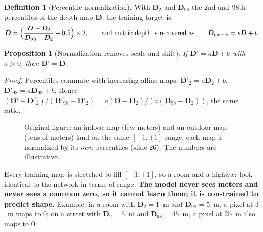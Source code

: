 \documentclass[11pt,a4paper]{article}
\theoremstyle{plain}
\newtheorem{proposition}[theorem]{Proposition}
\theoremstyle{definition}
\newtheorem{definition}[theorem]{Definition}
\numberwithin{equation}{section}
\begin{document}
\begin{definition}[Percentile normalization]
With $\bm D_2$ and $\bm D_{98}$ the 2nd and 98th percentiles of the depth map $\bm D$, the training target is
\begin{equation}
\tilde{\bm D}=\Bigl(\frac{\bm D-\bm D_2}{\bm D_{98}-\bm D_2}-0.5\Bigr)\times2,\qquad\text{and metric depth is recovered as}\qquad \tilde{\bm D}_{\text{metric}}=s\tilde{\bm D}+t .
\end{equation}
\end{definition}

\begin{proposition}[Normalization removes scale and shift]
If $\bm D'=a\bm D+b$ with $a>0$, then $\tilde{\bm D}'=\tilde{\bm D}$.
\end{proposition}
\begin{proof}
Percentiles commute with increasing affine maps: $\bm D'_2=a\bm D_2+b$, $\bm D'_{98}=a\bm D_{98}+b$. Hence $(\bm D'-\bm D'_2)/(\bm D'_{98}-\bm D'_2)=a(\bm D-\bm D_2)/(a(\bm D_{98}-\bm D_2))$, the same ratio.
\end{proof}

\begin{figure}[H]
\centering
{}
\caption{Original figure: an indoor map (few meters) and an outdoor map (tens of meters) land on the same $[-1,+1]$ range; each map is normalized by its \emph{own} percentiles (slide 26). The numbers are illustrative.}
\end{figure}

\begin{intuition}
Every training map is stretched to fill $[-1,+1]$, so a room and a highway look identical to the network in terms of range. \textbf{The model never sees meters and never sees a common zero, so it cannot learn them; it is constrained to predict shape.} Example: in a room with $\bm D_2=1$~m and $\bm D_{98}=5$~m, a pixel at $3$~m maps to $0$; on a street with $\bm D_2=5$~m and $\bm D_{98}=45$~m, a pixel at $25$~m also maps to $0$.
\end{intuition}
\end{document}
